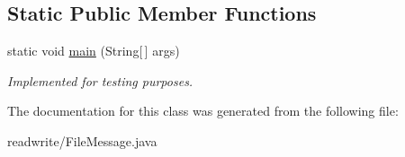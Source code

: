 \subsection*{Static Public Member Functions}
\begin{DoxyCompactItemize}
\item 
\mbox{\label{class_file_message_ae5e65a8c825bf0183f1dad827abf5e0f}} 
static void \hyperlink{class_file_message_ae5e65a8c825bf0183f1dad827abf5e0f}{main} (String\mbox{[}$\,$\mbox{]} args)
\begin{DoxyCompactList}\small\item\em Implemented for testing purposes. \end{DoxyCompactList}\end{DoxyCompactItemize}


The documentation for this class was generated from the following file\+:\begin{DoxyCompactItemize}
\item 
readwrite/File\+Message.\+java\end{DoxyCompactItemize}
